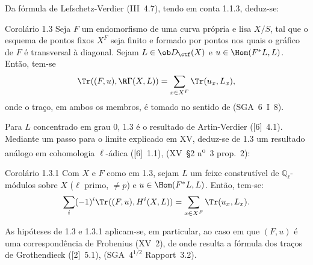 Da fórmula de Lefschetz-Verdier (III~4.7), tendo em conta 1.1.3, deduz-se:

\begin{statement}{Corolário 1.3}
Seja $F$ um endomorfismo de uma curva própria e lisa $X/S$, tal que o esquema de pontos fixos $X^F$ seja finito e formado por pontos nos quais o gráfico de $F$ é transversal à diagonal. Sejam $L\in\ob D_{\ctf}(X)$ e $u\in\Hom(F^*L,L)$. Então, tem-se
\[
\Tr((F,u),\R\Gamma(X,L))=\sum_{x\in X^F}\Tr(u_x,L_x),
\]
onde o traço, em ambos os membros, é tomado no sentido de (SGA~6~I~8).
\end{statement}

Para $L$ concentrado em grau $0$, 1.3 é o resultado de Artin-Verdier ([6]~4.1). Mediante um passo para o limite explicado em XV, deduz-se de 1.3 um resultado análogo em cohomologia $\ell$-ádica ([6]~1.1), (XV~\S2 n\textsuperscript{o}~3 prop.~2):

\begin{statement}{Corolário 1.3.1}
Com $X$ e $F$ como em 1.3, sejam $L$ um feixe construtível de $\mathbb Q_\ell$-módulos sobre $X$ ($\ell$ primo, $\ne p$) e $u\in\Hom(F^*L,L)$. Então, tem-se:
\[
\sum_i(-1)^i\Tr((F,u),H^i(X,L))=\sum_{x\in X^F}\Tr(u_x,L_x).
\]
\end{statement}

As hipóteses de 1.3 e 1.3.1 aplicam-se, em particular, ao caso em que $(F,u)$ é uma correspondência de Frobenius (XV~2), de onde resulta a fórmula dos traços de Grothendieck ([2]~5.1), (SGA~$4^{1/2}$ Rapport~3.2).
